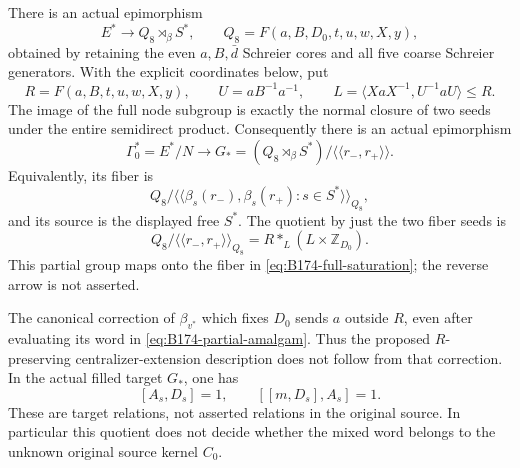 There is an actual epimorphism
\begin{equation}\label{eq:B174-generic-quotient}
 E^*\longrightarrow Q_8\rtimes_\beta S^*,\qquad
 Q_8=F(a,B,D_0,t,u,w,X,y),
\end{equation}
obtained by retaining the even \(a,B,\bar d\) Schreier cores and all
five coarse Schreier generators. With the explicit coordinates below,
put
\[
 R=F(a,B,t,u,w,X,y),\qquad U=aB^{-1}a^{-1},\qquad
 L=\langle XaX^{-1},U^{-1}aU\rangle\le R.
\]
The image of the full node subgroup is exactly the normal closure of
two seeds under the entire semidirect product. Consequently there is
an actual epimorphism
\begin{equation}\label{eq:B174-filled-quotient}
 \Gamma _0^*=E^*/N\longrightarrow
 G_*=(Q_8\rtimes_\beta S^*)/
       \langle\!\langle r_-,r_+\rangle\!\rangle.
\end{equation}
Equivalently, its fiber is
\begin{equation}\label{eq:B174-full-saturation}
 Q_8/\langle\!\langle
   \beta_s(r_-),\beta_s(r_+):s\in S^*
                         \rangle\!\rangle_{Q_8},
\end{equation}
and its source is the displayed free \(S^*\). The quotient by just
the two fiber seeds is
\begin{equation}\label{eq:B174-partial-amalgam}
 Q_8/\langle\!\langle r_-,r_+\rangle\!\rangle_{Q_8}
       =R*_{L}(L\times\mathbb Z_{D_0}).
\end{equation}
This partial group maps onto the fiber in
\eqref{eq:B174-full-saturation}; the reverse arrow is not asserted.

The canonical correction of \(\beta_{v^*}\) which fixes \(D_0\)
sends \(a\) outside \(R\), even after evaluating its word in
\eqref{eq:B174-partial-amalgam}. Thus the proposed \(R\)-preserving
centralizer-extension description does not follow from that correction.
In the actual filled target \(G_*\), one has
\[
 [A_s,D_s]=1,\qquad [[m,D_s],A_s]=1.
\]
These are target relations, not asserted relations in the original
source. In particular this quotient does not decide whether the mixed
word belongs to the unknown original source kernel \(C_0\).

